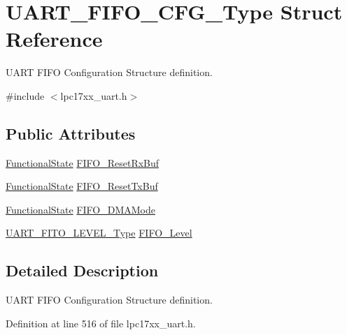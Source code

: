 \hypertarget{struct_u_a_r_t___f_i_f_o___c_f_g___type}{\section{\-U\-A\-R\-T\-\_\-\-F\-I\-F\-O\-\_\-\-C\-F\-G\-\_\-\-Type \-Struct \-Reference}
\label{struct_u_a_r_t___f_i_f_o___c_f_g___type}
}


\-U\-A\-R\-T \-F\-I\-F\-O \-Configuration \-Structure definition.  




{\ttfamily \#include $<$lpc17xx\-\_\-uart.\-h$>$}

\subsection*{\-Public \-Attributes}
\begin{DoxyCompactItemize}
\item 
\hyperlink{group___l_p_c___types___public___types_gac9a7e9a35d2513ec15c3b537aaa4fba1}{\-Functional\-State} \hyperlink{struct_u_a_r_t___f_i_f_o___c_f_g___type_a716224e98507c50ac54940ebfc51be6f}{\-F\-I\-F\-O\-\_\-\-Reset\-Rx\-Buf}
\item 
\hyperlink{group___l_p_c___types___public___types_gac9a7e9a35d2513ec15c3b537aaa4fba1}{\-Functional\-State} \hyperlink{struct_u_a_r_t___f_i_f_o___c_f_g___type_a21d70658d3e3b61667dd3bc27a7817f2}{\-F\-I\-F\-O\-\_\-\-Reset\-Tx\-Buf}
\item 
\hyperlink{group___l_p_c___types___public___types_gac9a7e9a35d2513ec15c3b537aaa4fba1}{\-Functional\-State} \hyperlink{struct_u_a_r_t___f_i_f_o___c_f_g___type_ac2290ece03c3cf70067e1043cb6dad9e}{\-F\-I\-F\-O\-\_\-\-D\-M\-A\-Mode}
\item 
\hyperlink{group___u_a_r_t___public___types_gad85d4333c1c346b3078d4abe95d4b2f7}{\-U\-A\-R\-T\-\_\-\-F\-I\-T\-O\-\_\-\-L\-E\-V\-E\-L\-\_\-\-Type} \hyperlink{struct_u_a_r_t___f_i_f_o___c_f_g___type_afe71db9c3088c092ae6a93ddba4e967d}{\-F\-I\-F\-O\-\_\-\-Level}
\end{DoxyCompactItemize}


\subsection{\-Detailed \-Description}
\-U\-A\-R\-T \-F\-I\-F\-O \-Configuration \-Structure definition. 

\-Definition at line 516 of file lpc17xx\-\_\-uart.\-h.




